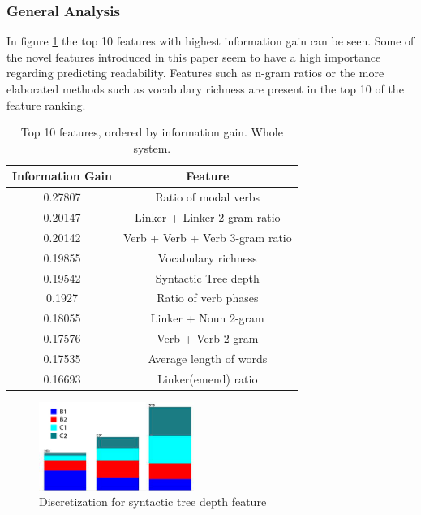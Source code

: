 \documentclass{acm_proc_article-sp}
\begin{document}
\subsubsection{General Analysis}
In figure \ref{tab:top10orokorra} the top 10 features with highest information gain can be seen. Some of the novel features introduced in this paper seem to have a high importance regarding predicting readability. Features such as n-gram ratios or the more elaborated methods such as vocabulary richness are present in the top 10 of the feature ranking.

\begin{table}
 \begin{center}
 \begin{tabular}{|c|c|}\hline
  {\bf Information Gain} & { \bf Feature } \\ \hline
 0.27807 & Ratio of modal verbs \\ \hline
 0.20147 & Linker + Linker 2-gram ratio \\ \hline
 0.20142 & Verb + Verb + Verb 3-gram ratio \\ \hline
 0.19855 & Vocabulary richness \\ \hline
 0.19542 & Syntactic Tree depth \\ \hline
 0.1927 & Ratio of verb phases \\ \hline
 0.18055 & Linker + Noun 2-gram \\ \hline
 0.17576 & Verb + Verb 2-gram \\ \hline
 0.17535 & Average length of words \\ \hline
 0.16693 & Linker(emend) ratio \\ \hline
 
 \end{tabular}
 \end{center}
 \caption{Top 10 features, ordered by information gain. Whole system.}
 \label{tab:top10orokorra}
\end{table}


 
\begin{figure}[h]

\centering
\includegraphics[width=0.45\textwidth]{disc_sakonera_orokorra}
\caption{Discretization for syntactic tree depth feature}
\label{disc_sakonera_orokorra}
\end{figure}
\end{document}
